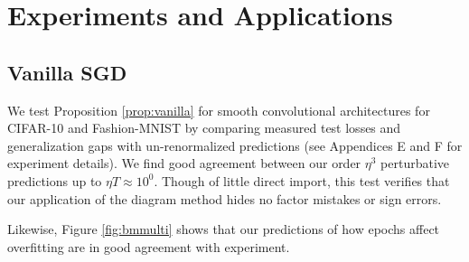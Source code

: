 \documentclass{article}
\newcommand{\lorem}[1]{
    Lorem ipsum dolor sit amet, consectetur adipiscing elit...\\
    \nopagebreak\vspace{#1cm} \ \\
    ...sunt in culpa qui officia deserunt mollit anim id est laborum.
}
\begin{document}

\section{Experiments and Applications}


    \subsection{Vanilla SGD}
        We test Proposition \ref{prop:vanilla} for smooth convolutional
        architectures for CIFAR-10 and Fashion-MNIST by comparing measured 
        test losses and generalization gaps with un-renormalized predictions
        (see Appendices E and F for experiment details).  We find good
        agreement between our order $\eta^3$ perturbative predictions up to
        $\eta T \approx 10^0$.  Though of little direct import, this test
        verifies that our application of the diagram method hides no factor
        mistakes or sign errors.

 
        Likewise, Figure \ref{fig:bmmulti} shows that our predictions of how 
        epochs affect overfitting are in good agreement with experiment. 
    
\end{document}
